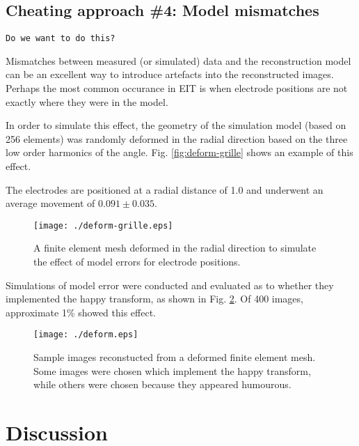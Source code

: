 \documentclass[12pt]{iopart}
\begin{document}
\subsection{ Cheating approach \#4:
             Model mismatches}

{\tt Do we want to do this?}

Mismatches between measured (or simulated) data and the
reconstruction model can be an excellent way to introduce
artefacts into the reconstructed images. Perhaps the
most common occurance in EIT is when electrode positions
are not exactly where they were in the model.

In order to simulate this effect, the geometry of
the simulation model (based on 256 elements) was randomly
deformed in the radial direction based on the three low
order harmonics of the angle.
Fig. \ref{fig:deform-grille} shows an example
of this effect.

The electrodes are positioned at a radial distance of 1.0
and underwent an average movement of $0.091\pm0.035$.

%
%
\begin{figure}[th]
\begin{flushright}
\texttt{[image: ./deform-grille.eps]}
\caption{\small 
A finite element mesh deformed in the radial direction to
simulate the effect of model errors for electrode positions.
 }
 \label{fig:deform}
\end{flushright}
\end{figure}

Simulations of model error were conducted and evaluated as
to whether they implemented the happy transform, as shown
in Fig. \ref{fig:deform}.
Of 400 images, approximate 1\% showed this effect. 

%
%
\begin{figure}[th]
\begin{flushright}
\texttt{[image: ./deform.eps]}
\caption{\small 
Sample images reconstucted from a deformed finite element
mesh. Some images were chosen which implement the happy
transform, while others were chosen because they appeared
humourous.
 }
 \label{fig:deform}
\end{flushright}
\end{figure}


\section{
 Discussion
}
\end{document}
